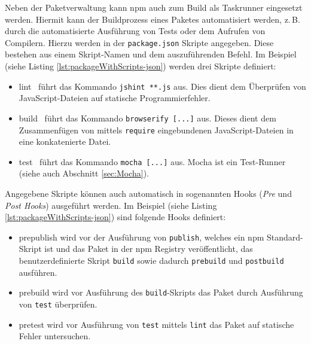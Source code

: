 \begin{figure}[H]
	
\end{figure}

Neben der Paketverwaltung kann npm auch zum Build als Taskrunner eingesetzt werden. Hiermit kann der Buildprozess eines Paketes automatisiert werden, z.\,B. durch die automatisierte Ausführung von Tests oder dem Aufrufen von Compilern. Hierzu werden in der \texttt{package.json} Skripte angegeben. Diese bestehen aus einem Skript-Namen und dem auszuführenden Befehl. Im Beispiel (siehe Listing \ref{lst:packageWithScripts-json}) werden drei Skripte definiert:\cite{cirkel-npmAsABuildTool}
\begin{itemize}
	\item \glqq lint\grqq~ führt das Kommando \texttt{jshint **.js} aus. Dies dient dem Überprüfen von JavaScript-Dateien auf statische Programmierfehler\cite{jshint-about}.
	\item \glqq build\grqq~ führt das Kommando \texttt{browserify [...]} aus. Dieses dient dem Zusammenfügen von mittels \texttt{require} eingebundenen JavaScript-Dateien in eine konkatenierte Datei\cite{browserify-about}.
	\item \glqq test\grqq~ führt das Kommando \texttt{mocha [...]} aus. Mocha ist ein Test-Runner (siehe auch Abschnitt \ref{sec:Mocha}).
\end{itemize}

Angegebene Skripte können auch automatisch in sogenannten Hooks (\textit{Pre} und \textit{Post Hooks}) ausgeführt werden. Im Beispiel (siehe Listing \ref{lst:packageWithScripts-json}) sind folgende Hooks definiert:\cite{cirkel-npmAsABuildTool}
\begin{itemize}
	\item \glqq prepublish\grqq{} wird vor der Ausführung von \texttt{publish}, welches ein npm Standard-Skript ist und das Paket in der npm Registry veröffentlicht\cite{npm-publish}, das benutzerdefinierte Skript \texttt{build} sowie dadurch \texttt{prebuild} und \texttt{postbuild} ausführen.
	\item \glqq prebuild\grqq{} wird vor Ausführung des \texttt{build}-Skripts das Paket durch Ausführung von \texttt{test} überprüfen.
	\item \glqq pretest\grqq{} wird vor Ausführung von \texttt{test} mittels \texttt{lint} das Paket auf statische Fehler untersuchen.
\end{itemize}

